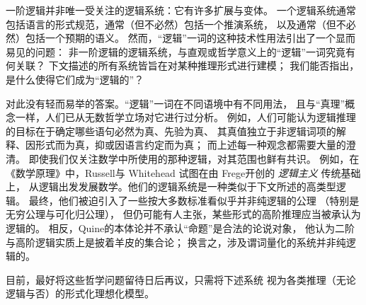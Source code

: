 \documentclass[../../../include/open-logic-section]{subfiles}
\begin{document}


一阶逻辑并非唯一受关注的逻辑系统：它有许多扩展与变体。
一个逻辑系统通常包括语言的形式规范，通常（但不必然）包括一个推演系统，
以及通常（但不必然）包括一个预期的语义。
然而，“逻辑”一词的这种技术性用法引出了一个显而易见的问题：
非一阶逻辑的逻辑系统，与直观或哲学意义上的“逻辑”一词究竟有何关联？
下文描述的所有系统皆旨在对某种推理形式进行建模；
我们能否指出，是什么使得它们成为“逻辑的”？

对此没有轻而易举的答案。“逻辑”一词在不同语境中有不同用法，
且与“真理”概念一样，人们已从无数哲学立场对它进行过分析。
例如，人们可能认为逻辑推理的目标在于确定哪些语句必然为真、先验为真、
其真值独立于非逻辑词项的解释、因形式而为真，抑或因语言约定而为真；
而上述每一种观念都需要大量的澄清。
即使我们仅关注数学中所使用的那种逻辑，对其范围也鲜有共识。
例如，在《数学原理》中，Russell与 Whitehead
试图在由 Frege开创的 {\em 逻辑主义} 传统基础上，
从逻辑出发发展数学。他们的逻辑系统是一种类似于下文所述的高类型逻辑。
最终，他们被迫引入了一些按大多数标准看似乎并非纯逻辑的公理
（特别是无穷公理与可化归公理），
但仍可能有人主张，某些形式的高阶推理应当被承认为逻辑的。
相反，Quine的本体论并不承认“命题”是合法的论说对象，
他认为二阶与高阶逻辑实质上是披着羊皮的集合论；
换言之，涉及谓词量化的系统并非纯逻辑的。

目前，最好将这些哲学问题留待日后再议，只需将下述系统
视为各类推理（无论逻辑与否）的形式化理想化模型。
\end{document}
